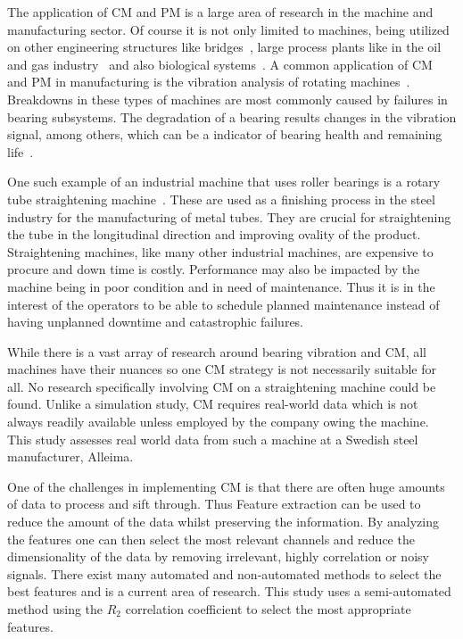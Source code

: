 \documentclass[]{article}
\begin{document}
The application of \gls{CM} and \gls{PM} is a large area of research in the machine and manufacturing sector. Of course it is not only limited to machines, being utilized on other engineering structures like bridges~\cite{buckley2023feature}, large process plants like in the oil and gas industry~\cite{telford2011condition} and also biological systems~\cite{tolocsi2011classification}. 
A common application of \gls{CM} and \gls{PM} in manufacturing is the vibration analysis of rotating machines~\cite{tiboni2022review, kateris2014machine}. Breakdowns in these types of machines are most commonly caused by failures in bearing subsystems. The degradation of a bearing results changes in the vibration signal, among others, which can be a indicator of bearing health and remaining life~\cite{zhang2016degradation}. 

One such example of an industrial machine that uses roller bearings is a rotary tube straightening machine~\cite{kato2014straightening, ma2020effect, ma2021analysis, yu2018theoretical, das1991mechanics, yoshimura2009effect, zhang2019modeling}. These are used as a finishing process in the steel industry for the manufacturing of metal tubes. They are crucial for straightening the tube in the longitudinal direction and improving ovality of the product. 
Straightening machines, like many other industrial machines, are expensive to procure and down time is costly. Performance may also be impacted by the machine being in poor condition and in need of maintenance. Thus it is in the interest of the operators to be able to schedule planned maintenance instead of having unplanned downtime and catastrophic failures.

While there is a vast array of research around bearing vibration and \gls{CM}, all machines have their nuances so one \gls{CM} strategy is not necessarily suitable for all. No research specifically involving \gls{CM} on a straightening machine could be found. Unlike a simulation study, \gls{CM} requires real-world data which is not always readily available unless employed by the company owing the machine. This study assesses real world data from such a machine at a Swedish steel manufacturer, Alleima.

One of the challenges in implementing \gls{CM} is that there are often huge amounts of data to process and sift through. Thus Feature extraction can be used to reduce the amount of the data whilst preserving the information. By analyzing the features one can then select the most relevant channels and reduce the dimensionality of the data by removing irrelevant, highly correlation or noisy signals. There exist many automated and non-automated methods to select the best features and is a current area of research. This study uses a semi-automated method using the $R_2$ correlation coefficient to select the most appropriate features.
\end{document}
